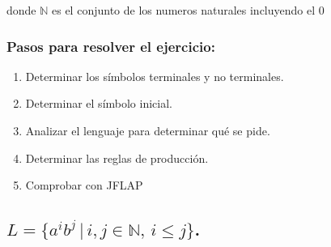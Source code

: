 \documentclass{article}
\begin{document}
        \begin{flushleft}
            donde $\mathbb{N}$ es el conjunto de los numeros naturales incluyendo el 0
        \end{flushleft}

        \vspace{\baselineskip} %

        \begin{flushleft}
            
            \subsubsection*{Pasos para resolver el ejercicio:}
                        
            \begin{enumerate}
                \item Determinar los símbolos terminales y no terminales.
                \item Determinar el símbolo inicial.
                \item Analizar el lenguaje para determinar qué se pide.
                \item Determinar las reglas de producción.
                \item Comprobar con JFLAP  
            \end{enumerate}
        \end{flushleft}


        \newpage


        \subsection{$L = \{a^i b^j \, | \, i, j \in \mathbb{N}, \, i \leq j\}$.}
\end{document}

